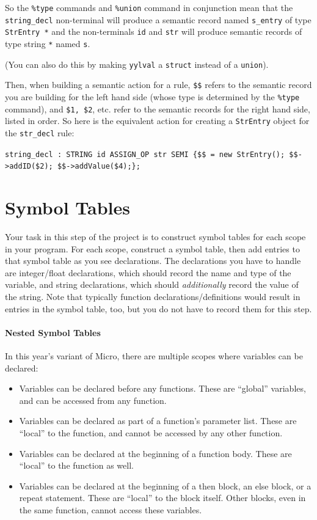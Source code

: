 \documentclass{article}
\begin{document}
So the \texttt{\%type} commands and \texttt{\%union} command in conjunction mean that the \texttt{string\_decl} non-terminal will produce a semantic record named \texttt{s\_entry} of type \texttt{StrEntry *} and the non-terminals \texttt{id} and \texttt{str} will produce semantic records of type string \texttt{*} named \texttt{s}.

(You can also do this by making \texttt{yylval} a \texttt{struct} instead of a \texttt{union}).

Then, when building a semantic action for a rule, \texttt{\$\$} refers to the semantic record you are building for the left hand side (whose type is determined by the \texttt{\%type} command), and \texttt{\$1, \$2}, etc. refer to the semantic records for the right hand side, listed in order. So here is the equivalent action for creating a \texttt{StrEntry} object for the \texttt{str\_decl} rule:

\texttt{string\_decl : STRING id ASSIGN\_OP str SEMI \{\$\$ = new StrEntry(); \$\$->addID(\$2); \$\$->addValue(\$4);\};}


\section{Symbol Tables}
Your task in this step of the project is to construct symbol tables for each scope in your program. For each scope, construct a symbol table, then add entries to that symbol table as you see declarations. The declarations you have to handle are integer/float declarations, which should record the name and type of the variable, and string declarations, which should {\em additionally} record the value of the string. Note that typically function declarations/definitions would result in entries in the symbol table, too, but you do not have to record them for this step.

\paragraph{Nested Symbol Tables}

In this year's variant of Micro, there are multiple scopes where variables can be declared:
\begin{itemize}
	\item Variables can be declared before any functions. These are ``global'' variables, and can be accessed from any function.
	\item Variables can be declared as part of a function's parameter list. These are ``local'' to the function, and cannot be accessed by any other function.
	\item Variables can be declared at the beginning of a function body. These are ``local'' to the function as well.
	\item Variables can be declared at the beginning of a then block, an else block, or a repeat statement. These are ``local'' to the block itself. Other blocks, even in the same function, cannot access these variables.
\end{itemize}
\end{document}
